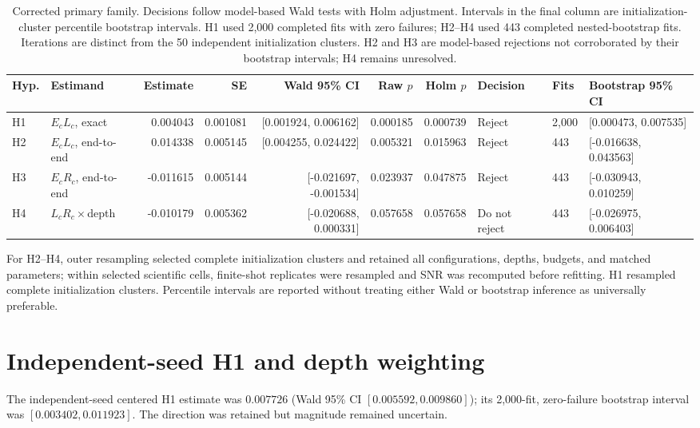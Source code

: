 \documentclass[pdflatex,sn-basic,Numbered]{sn-jnl}
\begin{document}
\begin{table}[t]
\centering\scriptsize
\begin{tabular}{llrrrrrlll}
\toprule
Hyp. & Estimand & Estimate & SE & Wald 95\% CI & Raw $p$ & Holm $p$ & Decision & Fits & Bootstrap 95\% CI \\
\midrule
H1 & $E_cL_c$, exact & 0.004043 & 0.001081 & [0.001924, 0.006162] & 0.000185 & 0.000739 & Reject & 2,000 & [0.000473, 0.007535] \\
H2 & $E_cL_c$, end-to-end & 0.014338 & 0.005145 & [0.004255, 0.024422] & 0.005321 & 0.015963 & Reject & 443 & [-0.016638, 0.043563] \\
H3 & $E_cR_c$, end-to-end & -0.011615 & 0.005144 & [-0.021697, -0.001534] & 0.023937 & 0.047875 & Reject & 443 & [-0.030943, 0.010259] \\
H4 & $L_cR_c\times$depth & -0.010179 & 0.005362 & [-0.020688, 0.000331] & 0.057658 & 0.057658 & Do not reject & 443 & [-0.026975, 0.006403] \\
\bottomrule
\end{tabular}
\caption{Corrected primary family. Decisions follow model-based Wald tests with Holm adjustment. Intervals in the final column are initialization-cluster percentile bootstrap intervals. H1 used 2,000 completed fits with zero failures; H2--H4 used 443 completed nested-bootstrap fits. Iterations are distinct from the 50 independent initialization clusters. H2 and H3 are model-based rejections not corroborated by their bootstrap intervals; H4 remains unresolved.}
\label{supp:tab:primary}
\end{table}

For H2--H4, outer resampling selected complete initialization clusters and retained all configurations, depths, budgets, and matched parameters; within selected scientific cells, finite-shot replicates were resampled and SNR was recomputed before refitting. H1 resampled complete initialization clusters. Percentile intervals are reported without treating either Wald or bootstrap inference as universally preferable.

\section{Independent-seed H1 and depth weighting}

The independent-seed centered H1 estimate was $0.007726$ (Wald 95\% CI $[0.005592,0.009860]$); its 2,000-fit, zero-failure bootstrap interval was $[0.003402,0.011923]$. The direction was retained but magnitude remained uncertain.
\end{document}
